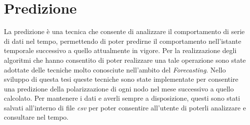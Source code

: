 \section{Predizione}
La predizione è una tecnica che consente di analizzare il comportamento di serie di dati nel tempo, permettendo di poter predirne il comportamento nell'istante temporale successivo a quello attualmente in vigore.
Per la realizzazione degli algoritmi che hanno consentito di poter realizzare una tale operazione sono state adottate delle tecniche molto conosciute nell'ambito del \textit{Forecasting}.
Nello sviluppo di questa tesi queste tecniche sono state implementate per consentire una predizione della polarizzazione di ogni nodo nel mese successivo a quello calcolato. Per mantenere i dati e averli sempre a disposizione, questi sono stati salvati all'interno di file \textit{csv} per poter consentire all'utente di poterli analizzare e consultare nel tempo.
